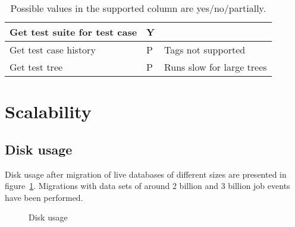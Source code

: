 \begin{table}[h]
\begin{tabular}{|l|l|l|}
Get test suite for test case                 & Y                                                                                        &                            \\ \hline
Get test case history                        & P                                                                                        & Tags not supported         \\ \hline
Get test tree                                & P                                                                                        & Runs slow for large trees  \\ \hline
\end{tabular}
\caption{Possible values in the supported column are yes/no/partially.}
\label{tab:archivequeries}
\end{table}


\section{Scalability}
\subsection{Disk usage}
Disk usage after migration of live databases of different sizes are presented in figure~\ref{fig:disc}. Migrations with data sets of around 2 billion and 3 billion job events have been performed.  
\begin{figure}[h!]
\centering
{}
\caption{Disk usage}
\label{fig:disc}
\end{figure}
